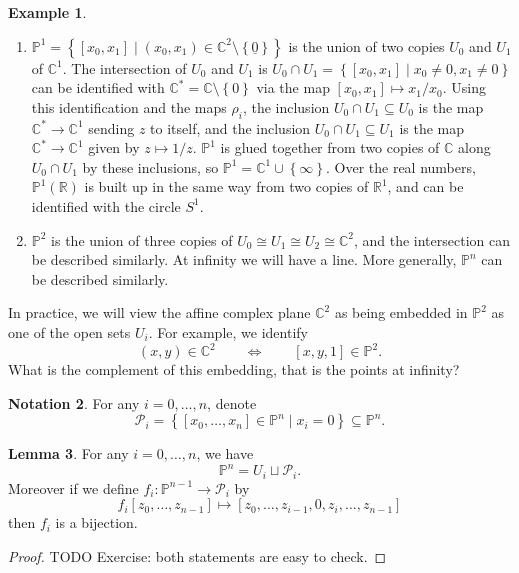 \documentclass{article}
\newcommand{\R}{\mathbb{R}}
\newcommand{\C}{\mathbb{C}}
\renewcommand{\P}{\mathbb{P}}
\newcommand{\rb}[1]{\left( #1 \right)}
\renewcommand{\sb}[1]{\left[ #1 \right]}
\newcommand{\cb}[1]{\left\{ #1 \right\}}
\theoremstyle{definition}\newtheorem{definition}{Definition}[section]
\theoremstyle{definition}\newtheorem{notation}[definition]{Notation}
\theoremstyle{definition}\newtheorem{remark}[definition]{Remark}
\theoremstyle{definition}\newtheorem{example}[definition]{Example}
\theoremstyle{definition}\newtheorem{fact}{Fact}
\theoremstyle{definition}\newtheorem{exercise}{Exercise}
\newtheorem{lemma}[definition]{Lemma}
\begin{document}
\begin{example}
\hfill
\begin{enumerate}
\item $ \P^1 = \cb{\sb{x_0, x_1} \mid \rb{x_0, x_1} \in \C^2 \setminus \cb{\underline{0}}} $ is the union of two copies $ U_0 $ and $ U_1 $ of $ \C^1 $. The intersection of $ U_0 $ and $ U_1 $ is $ U_0 \cap U_1 = \cb{\sb{x_0, x_1} \mid x_0 \ne 0, x_1 \ne 0} $ can be identified with $ \C^* = \C \setminus \cb{0} $ via the map $ \sb{x_0, x_1} \mapsto x_1 / x_0 $. Using this identification and the maps $ \rho_i $, the inclusion $ U_0 \cap U_1 \subseteq U_0 $ is the map $ \C^* \to \C^1 $ sending $ z $ to itself, and the inclusion $ U_0 \cap U_1 \subseteq U_1 $ is the map $ \C^* \to \C^1 $ given by $ z \mapsto 1 / z $. $ \P^1 $ is glued together from two copies of $ \C $ along $ U_0 \cap U_1 $ by these inclusions, so $ \P^1 = \C^1 \cup \cb{\infty} $. Over the real numbers, $ \P^1\rb{\R} $ is built up in the same way from two copies of $ \R^1 $, and can be identified with the circle $ S^1 $.
\item $ \P^2 $ is the union of three copies of $ U_0 \cong U_1 \cong U_2 \cong \C^2 $, and the intersection can be described similarly. At infinity we will have a line. More generally, $ \P^n $ can be described similarly.
\end{enumerate}
\end{example}

In practice, we will view the affine complex plane $ \C^2 $ as being embedded in $ \P^2 $ as one of the open sets $ U_i $. For example, we identify
$$ \rb{x, y} \in \C^2 \qquad \iff \qquad \sb{x, y, 1} \in \P^2. $$
What is the complement of this embedding, that is the points at infinity?

\begin{notation}
For any $ i = 0, \dots, n $, denote
$$ \mathcal{P}_i = \cb{\sb{x_0, \dots, x_n} \in \P^n \mid x_i = 0} \subseteq \P^n. $$
\end{notation}

\begin{lemma}
For any $ i = 0, \dots, n $, we have
$$ \P^n = U_i \sqcup \mathcal{P}_i. $$
Moreover if we define $ f_i : \P^{n - 1} \to \mathcal{P}_i $ by
$$ f_i\sb{z_0, \dots, z_{n - 1}} \mapsto \sb{z_0, \dots, z_{i - 1}, 0, z_i, \dots, z_{n - 1}} $$
then $ f_i $ is a bijection.
\end{lemma}

\begin{proof}
TODO Exercise: both statements are easy to check.
\end{proof}
\end{document}
